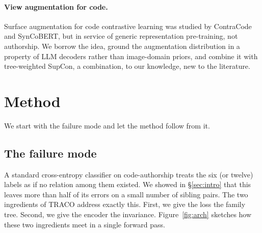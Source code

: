 ﻿\documentclass[11pt]{article}
\newcommand{\method}{\textsc{TRACO}\xspace}
\begin{document}
\paragraph{View augmentation for code.} Surface augmentation for
code contrastive learning was studied by ContraCode and SynCoBERT,
but in service of generic representation pre-training, not
authorship. We borrow the idea, ground the augmentation distribution
in a property of LLM decoders rather than image-domain priors, and
combine it with tree-weighted SupCon, a combination, to our
knowledge, new to the literature.

\section{Method}
\label{sec:method}

We start with the failure mode and let the method follow from it.

\subsection{The failure mode}

A standard cross-entropy classifier on code-authorship treats the
six (or twelve) labels as if no relation among them existed. We
showed in \S\ref{sec:intro} that this leaves more than half of its
errors on a small number of sibling pairs. The two ingredients of
\method address exactly this. First, we give the loss the family
tree. Second, we give the encoder the invariance.
Figure~\ref{fig:arch} sketches how these two ingredients meet in a
single forward pass.
\end{document}
